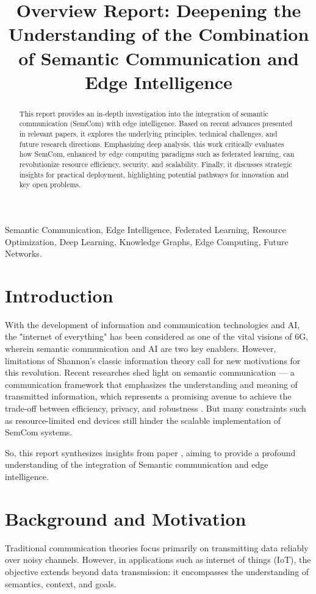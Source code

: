 \documentclass[conference]{IEEEtran}
\title{Overview Report: Deepening the Understanding of the Combination of Semantic Communication and Edge Intelligence}
\begin{document}
\maketitle

\begin{abstract}
This report provides an in-depth investigation into the integration of semantic communication (SemCom) with edge intelligence. Based on recent advances presented in relevant papers, it explores the underlying principles, technical challenges, and future research directions. Emphasizing deep analysis, this work critically evaluates how SemCom, enhanced by edge computing paradigms such as federated learning, can revolutionize resource efficiency, security, and scalability. Finally, it discusses strategic insights for practical deployment, highlighting potential pathways for innovation and key open problems.
\end{abstract}

\begin{IEEEkeywords}
Semantic Communication, Edge Intelligence, Federated Learning, Resource Optimization, Deep Learning, Knowledge Graphs, Edge Computing, Future Networks.
\end{IEEEkeywords}

\section{Introduction}
With the development of information and communication technologies and AI, the "internet of everything" 
has been considered as one of the vital visions of 6G, wherein semantic communication and AI 
are two key enablers. However, limitations of Shannon's classic information theory 
call for new motivations for this revolution. Recent researches shed light on semantic communication --- a communication 
framework that emphasizes the understanding and meaning of transmitted 
information, which represents a promising avenue to achieve the trade-off between efficiency, 
privacy, and robustness \cite{a1, a2}. But many constraints such as resource-limited end devices 
still hinder the scalable implementation of SemCom systems.

So, this report synthesizes insights from paper \cite{a3}, aiming to provide a profound understanding of the integration of Semantic communication and edge intelligence.

\section{Background and Motivation}
Traditional communication theories focus primarily on transmitting data reliably over 
noisy channels. However, in applications such as internet of things (IoT), the objective 
extends beyond data transmission: it encompasses the understanding of 
semantics, context, and goals.
\end{document}

